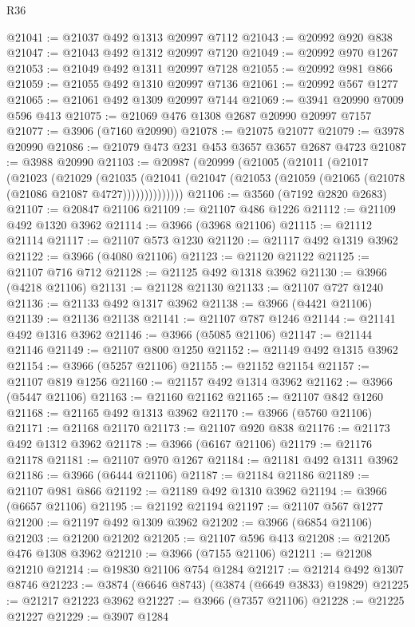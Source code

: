 \begin{lexlean}{R36}
\begin{coremodule}
@21041 := @21037 @492 @1313 @20997 @7112
@21043 := @20992 @920 @838
@21047 := @21043 @492 @1312 @20997 @7120
@21049 := @20992 @970 @1267
@21053 := @21049 @492 @1311 @20997 @7128
@21055 := @20992 @981 @866
@21059 := @21055 @492 @1310 @20997 @7136
@21061 := @20992 @567 @1277
@21065 := @21061 @492 @1309 @20997 @7144
@21069 := @3941 @20990 @7009 @596 @413
@21075 := @21069 @476 @1308 @2687 @20990 @20997 @7157
@21077 := @3906 (@7160 @20990)
@21078 := @21075 @21077
@21079 := @3978 @20990
@21086 := @21079 @473 @231 @453 @3657 @3657 @2687 @4723
@21087 := @3988 @20990
@21103 := @20987
    (@20999
      (@21005
        (@21011
          (@21017
            (@21023
              (@21029
                (@21035
                  (@21041 (@21047 (@21053 (@21059 (@21065 (@21078 (@21086 @21087 @4727))))))))))))))
@21106 := @3560 (@7192 @2820 @2683)
@21107 := @20847 @21106
@21109 := @21107 @486 @1226
@21112 := @21109 @492 @1320 @3962
@21114 := @3966 (@3968 @21106)
@21115 := @21112 @21114
@21117 := @21107 @573 @1230
@21120 := @21117 @492 @1319 @3962
@21122 := @3966 (@4080 @21106)
@21123 := @21120 @21122
@21125 := @21107 @716 @712
@21128 := @21125 @492 @1318 @3962
@21130 := @3966 (@4218 @21106)
@21131 := @21128 @21130
@21133 := @21107 @727 @1240
@21136 := @21133 @492 @1317 @3962
@21138 := @3966 (@4421 @21106)
@21139 := @21136 @21138
@21141 := @21107 @787 @1246
@21144 := @21141 @492 @1316 @3962
@21146 := @3966 (@5085 @21106)
@21147 := @21144 @21146
@21149 := @21107 @800 @1250
@21152 := @21149 @492 @1315 @3962
@21154 := @3966 (@5257 @21106)
@21155 := @21152 @21154
@21157 := @21107 @819 @1256
@21160 := @21157 @492 @1314 @3962
@21162 := @3966 (@5447 @21106)
@21163 := @21160 @21162
@21165 := @21107 @842 @1260
@21168 := @21165 @492 @1313 @3962
@21170 := @3966 (@5760 @21106)
@21171 := @21168 @21170
@21173 := @21107 @920 @838
@21176 := @21173 @492 @1312 @3962
@21178 := @3966 (@6167 @21106)
@21179 := @21176 @21178
@21181 := @21107 @970 @1267
@21184 := @21181 @492 @1311 @3962
@21186 := @3966 (@6444 @21106)
@21187 := @21184 @21186
@21189 := @21107 @981 @866
@21192 := @21189 @492 @1310 @3962
@21194 := @3966 (@6657 @21106)
@21195 := @21192 @21194
@21197 := @21107 @567 @1277
@21200 := @21197 @492 @1309 @3962
@21202 := @3966 (@6854 @21106)
@21203 := @21200 @21202
@21205 := @21107 @596 @413
@21208 := @21205 @476 @1308 @3962
@21210 := @3966 (@7155 @21106)
@21211 := @21208 @21210
@21214 := @19830 @21106 @754 @1284
@21217 := @21214 @492 @1307 @8746
@21223 := @3874 (@6646 @8743) (@3874 (@6649 @3833) @19829)
@21225 := @21217 @21223 @3962
@21227 := @3966 (@7357 @21106)
@21228 := @21225 @21227
@21229 := @3907 @1284

\end{coremodule}
\end{lexlean}
